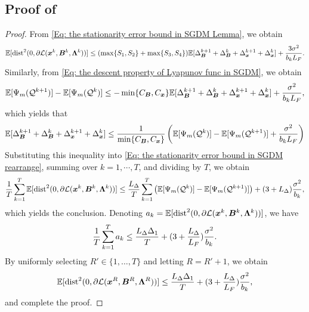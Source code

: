 \subsection{Proof of }
\label{Subsubsec: convergence rate SGDM}
\begin{proof}
    From \eqref{Eq: the stationarity error bound in SGDM Lemma}, we obtain
    {\small
    \begin{align}\label{Eq: the stationarity error bound in SGDM rearrange}
        \mathbb{E}[\mathrm{dist}^{2}(0, \partial \mathcal{L}(\bm{x}^{k}, \bm{B}^{k}, \bm{\Lambda}^{k}))] \leq ( \max\{S_{1}, S_{2}\} + \max\{S_{3}, S_{4}\}) \mathbb{E} [\Delta_{\bm{B}}^{k+1}+ \Delta_{\bm{B}}^{k}+ \Delta_{\bm{x}}^{k+1}+ \Delta_{\bm{x}}^{k}] + \frac{3 \sigma^{2}}{b_{k}L_{F}}.\end{align}}
    Similarly, from \eqref{Eq: the descent property of Lyapunov func in SGDM}, we
    obtain
    \[
        \mathbb{E} [\Psi_m(\mathcal{Q}^{k+1})] - \mathbb{E}[\Psi_m(\mathcal{Q}^{k})]
        \leq -\min \{ C_{\bm{B}}, C_{\bm{x}}\}\mathbb{E}[\Delta_{\bm{B}}^{k+1}+ \Delta_{\bm{B}}^{k}+
        \Delta_{\bm{x}}^{k+1}+ \Delta_{\bm{x}}^{k}] + \frac{\sigma^{2}}{b_{k}L_{F}},
    \]
    which yields that
    \[
        \mathbb{E}[\Delta_{\bm{B}}^{k+1}+ \Delta_{\bm{B}}^{k}+ \Delta_{\bm{x}}^{k+1}+ \Delta_{\bm{x}}
        ^{k}] \leq \frac{1}{\min \{ C_{\bm{B}}, C_{\bm{x}}\}}\left( \mathbb{E} [\Psi_m(\mathcal{Q}
        ^{k})] - \mathbb{E}[\Psi_m(\mathcal{Q}^{k+1})] + \frac{\sigma^{2}}{b_{k}L_{F}}
        \right)
    \]
    Substituting this inequality into \eqref{Eq: the stationarity error bound in SGDM rearrange},
    summing over $k = 1, \cdots,T$, and dividing by $T$, we obtain
    \[
        \frac{1}{T}\sum\limits_{ k =1}^{T} \mathbb{E}[\mathrm{dist}^{2}(0, \partial \mathcal{L}(\bm{x}
        ^{k}, \bm{B}^{k}, \bm{\Lambda}^{k}))] \leq \frac{L_{\Delta}}{T}\sum\limits_{ k =1}^{T}
        \left(\mathbb{E} [\Psi_m(\mathcal{Q}^{k})] - \mathbb{E} [\Psi_m
        (\mathcal{Q}^{k+1})] \right) + ( 3 + L_{\Delta}) \frac{\sigma^{2}}{b_{k}},
    \]which yields the conclusion. Denoting
    $a_{k}= \mathbb{E}[\mathrm{dist}^{2}(0, \partial \mathcal{L}(\bm{x}^{k}, \bm{B}
    ^{k}, \bm{\Lambda}^{k}))]$, we have
    \[
        \frac{1}{T}\sum\limits_{ k =1}^{T} a_{k}\leq \frac{L_{\Delta}\Delta_{1}}{T}+ ( 3 + \frac{L_{\Delta}}{L_F}
        ) \frac{\sigma^{2}}{b_{k}}.
    \]
    By uniformly selecting $R' \in \{1, \ldots, T\}$ and letting $R = R' + 1$,
    we obtain
    \[
        \mathbb{E}[\mathrm{dist}^{2}(0, \partial \mathcal{L}(\bm{x}^{R}, \bm{B}^{R}
        , \bm{\Lambda}^{R}))] \leq \frac{L_{\Delta}\Delta_{1}}{T}+ ( 3 + \frac{L_{\Delta}}{L_F}
        ) \frac{\sigma^{2}}{b_{k}},
    \] and complete the proof.
\end{proof}
